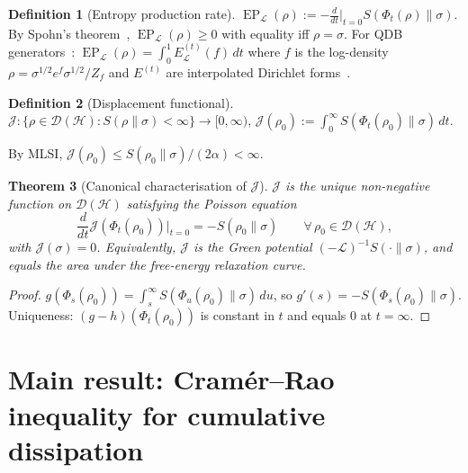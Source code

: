 \documentclass[11pt,a4paper]{article}
\newtheorem{theorem}{Theorem}[section]
\theoremstyle{definition}
\newtheorem{definition}[theorem]{Definition}
\theoremstyle{remark}
\DeclareMathOperator{\EP}{EP}
\newcommand{\HH}{\mathcal{H}}
\newcommand{\DD}{\mathcal{D}}
\newcommand{\LL}{\mathcal{L}}
\newcommand{\ddt}{\tfrac{d}{dt}}
\begin{document}
\begin{definition}[Entropy production rate]\label{def:EP}
$\EP_\LL(\rho) := -\ddt\big|_{t=0}S(\Phi_t(\rho)\|\sigma)$.
By Spohn's theorem~\cite{Spohn1978}, $\EP_\LL(\rho) \ge 0$ with
equality iff $\rho = \sigma$.  For QDB
generators~\cite{CarlenMaas2017,GaoRouze2022}:
$\EP_\LL(\rho) = \int_0^1 E^{(t)}_\LL(f)\,dt$ where $f$ is the
log-density $\rho = \sigma^{1/2}e^f\sigma^{1/2}/Z_f$ and $E^{(t)}$
are interpolated Dirichlet
forms~\cite{CarlenMaas2017,OlkiewiczZegarlinski1999}.
\end{definition}

\begin{definition}[Displacement functional]\label{def:J}
$\mathcal{J} : \{\rho \in \DD(\HH) : S(\rho\|\sigma) < \infty\}
\to [0, \infty)$,\quad
$\mathcal{J}(\rho_0) := \int_0^\infty S(\Phi_t(\rho_0)\|\sigma)\,dt$.
\end{definition}

By MLSI, $\mathcal{J}(\rho_0) \le S(\rho_0\|\sigma)/(2\alpha)
< \infty$.

\begin{theorem}[Canonical characterisation of $\mathcal{J}$]\label{thm:canonical}
$\mathcal{J}$ is the unique non-negative function on $\DD(\HH)$
satisfying the Poisson equation
\begin{equation}\label{eq:Poisson}
  \frac{d}{dt}\mathcal{J}(\Phi_t(\rho_0))\Big|_{t=0}
  = -S(\rho_0\|\sigma)
  \qquad \forall\, \rho_0 \in \DD(\HH),
\end{equation}
with $\mathcal{J}(\sigma) = 0$.
Equivalently, $\mathcal{J}$ is the Green potential
$(-\LL)^{-1}S(\cdot\|\sigma)$, and equals the area under the
free-energy relaxation curve.
\end{theorem}

\begin{proof}
$g(\Phi_s(\rho_0)) = \int_s^\infty S(\Phi_u(\rho_0)\|\sigma)\,du$,
so $g'(s) = -S(\Phi_s(\rho_0)\|\sigma)$.
Uniqueness: $(g-h)(\Phi_t(\rho_0))$ is constant in $t$ and equals
$0$ at $t = \infty$.
\end{proof}
\section{Main result: Cram\'er--Rao inequality for cumulative
dissipation}\label{sec:main}
\end{document}
